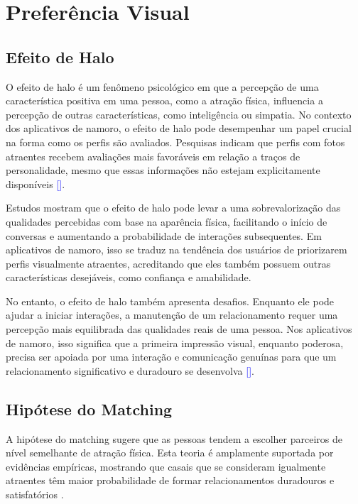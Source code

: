 \section{Preferência Visual}

\subsection{Efeito de Halo}

O efeito de halo é um fenômeno psicológico em que a percepção de uma característica positiva em uma pessoa, como a atração física, influencia a percepção de outras características, como inteligência ou simpatia. No contexto dos aplicativos de namoro, o efeito de halo pode desempenhar um papel crucial na forma como os perfis são avaliados. Pesquisas indicam que perfis com fotos atraentes recebem avaliações mais favoráveis em relação a traços de personalidade, mesmo que essas informações não estejam explicitamente disponíveis \textcolor{blue}{[\cite{jones2021attractiveness}]}.

Estudos mostram que o efeito de halo pode levar a uma sobrevalorização das qualidades percebidas com base na aparência física, facilitando o início de conversas e aumentando a probabilidade de interações subsequentes. Em aplicativos de namoro, isso se traduz na tendência dos usuários de priorizarem perfis visualmente atraentes, acreditando que eles também possuem outras características desejáveis, como confiança e amabilidade.

No entanto, o efeito de halo também apresenta desafios. Enquanto ele pode ajudar a iniciar interações, a manutenção de um relacionamento requer uma percepção mais equilibrada das qualidades reais de uma pessoa. Nos aplicativos de namoro, isso significa que a primeira impressão visual, enquanto poderosa, precisa ser apoiada por uma interação e comunicação genuínas para que um relacionamento significativo e duradouro se desenvolva \textcolor{blue}{[\cite{ramaker2020impact}]}.

\subsection{Hipótese do Matching}

A hipótese do matching sugere que as pessoas tendem a escolher parceiros de nível semelhante de atração física. Esta teoria é amplamente suportada por evidências empíricas, mostrando que casais que se consideram igualmente atraentes têm maior probabilidade de formar relacionamentos duradouros e satisfatórios \cite{Walster1966}.

